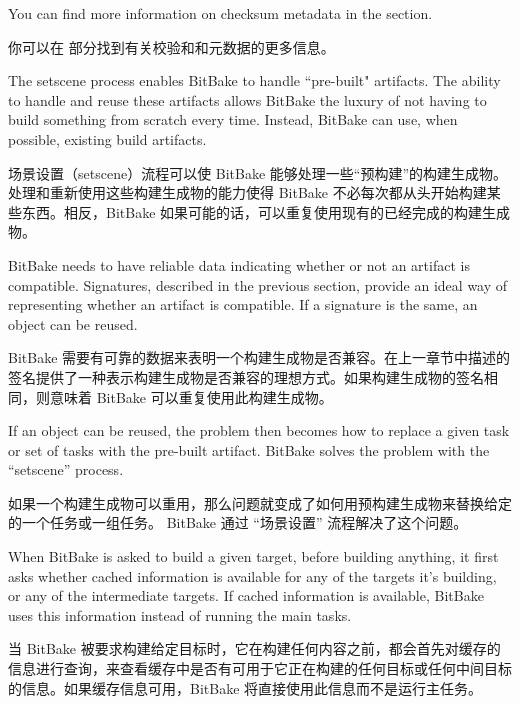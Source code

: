 You can find more information on checksum metadata in the  section.

你可以在  部分找到有关校验和和元数据的更多信息。


\label{section:Setscene}

The setscene process enables BitBake to handle ``pre-built" artifacts\footnotemark[1]. The ability to handle and reuse these artifacts allows BitBake the luxury of not having to build something from scratch every time. Instead, BitBake can use, when possible, existing build artifacts.

场景设置（setscene）流程可以使 BitBake 能够处理一些``预构建''的构建生成物\footnotemark[1]。处理和重新使用这些构建生成物的能力使得 BitBake 不必每次都从头开始构建某些东西。相反，BitBake 如果可能的话，可以重复使用现有的已经完成的构建生成物。


BitBake needs to have reliable data indicating whether or not an artifact is compatible. Signatures, described in the previous section, provide an ideal way of representing whether an artifact is compatible. If a signature is the same, an object can be reused.

BitBake 需要有可靠的数据来表明一个构建生成物是否兼容。在上一章节中描述的签名提供了一种表示构建生成物是否兼容的理想方式。如果构建生成物的签名相同，则意味着 BitBake 可以重复使用此构建生成物。

If an object can be reused, the problem then becomes how to replace a given task or set of tasks with the pre-built artifact. BitBake solves the problem with the ``setscene'' process.

如果一个构建生成物可以重用，那么问题就变成了如何用预构建生成物来替换给定的一个任务或一组任务。 BitBake 通过 ``场景设置'' 流程解决了这个问题。

When BitBake is asked to build a given target, before building anything, it first asks whether cached information is available for any of the targets it's building, or any of the intermediate targets. If cached information is available, BitBake uses this information instead of running the main tasks.

当 BitBake 被要求构建给定目标时，它在构建任何内容之前，都会首先对缓存的信息进行查询，来查看缓存中是否有可用于它正在构建的任何目标或任何中间目标的信息。如果缓存信息可用，BitBake 将直接使用此信息而不是运行主任务。

